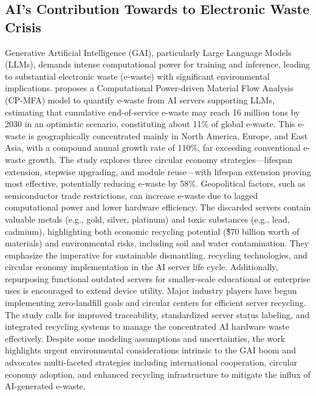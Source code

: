 \documentclass[a4paper, 12pt]{article}
\begin{document}
\subsection{AI's Contribution Towards to Electronic Waste Crisis}
Generative Artificial Intelligence (GAI), particularly Large Language Models (LLMs), demands intense computational power for training and inference, leading to substantial electronic waste (e-waste) with significant environmental implications. \citet{wang_2024_ewaste} proposes a Computational Power-driven Material Flow Analysis (CP-MFA) model to quantify e-waste from AI servers supporting LLMs, estimating that cumulative end-of-service e-waste may reach 16 million tons by 2030 in an optimistic scenario, constituting about 11\% of global e-waste. This e-waste is geographically concentrated mainly in North America, Europe, and East Asia, with a compound annual growth rate of 110\%, far exceeding conventional e-waste growth. The study explores three circular economy strategies—lifespan extension, stepwise upgrading, and module reuse—with lifespan extension proving most effective, potentially reducing e-waste by 58\%. Geopolitical factors, such as semiconductor trade restrictions, can increase e-waste due to lagged computational power and lower hardware efficiency. The discarded servers contain valuable metals (e.g., gold, silver, platinum) and toxic substances (e.g., lead, cadmium), highlighting both economic recycling potential (\~\$70 billion worth of materials) and environmental risks, including soil and water contamination. They emphasize the imperative for sustainable dismantling, recycling technologies, and circular economy implementation in the AI server life cycle. Additionally, repurposing functional outdated servers for smaller-scale educational or enterprise uses is encouraged to extend device utility. Major industry players have begun implementing zero-landfill goals and circular centers for efficient server recycling. The study calls for improved traceability, standardized server status labeling, and integrated recycling systems to manage the concentrated AI hardware waste effectively. Despite some modeling assumptions and uncertainties, the work highlights urgent environmental considerations intrinsic to the GAI boom and advocates multi-faceted strategies including international cooperation, circular economy adoption, and enhanced recycling infrastructure to mitigate the influx of AI-generated e-waste.
\end{document}
